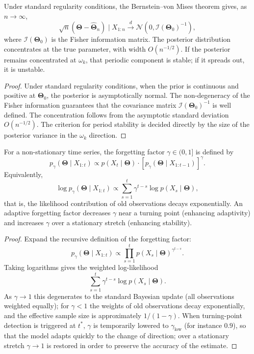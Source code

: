\begin{proposition}\label{prop:ts_bayes_convergence}
Under standard regularity conditions, the Bernstein--von Mises theorem gives, as $n \to \infty$,
\[
\sqrt{n}(\boldsymbol{\Theta} - \hat{\boldsymbol{\Theta}}_n) \mid X_{1:n} \xrightarrow{d} \mathcal{N}(0, \mathcal{I}(\boldsymbol{\Theta}_0)^{-1}),
\]
where $\mathcal{I}(\boldsymbol{\Theta}_0)$ is the Fisher information matrix. The posterior distribution concentrates at the true parameter, with width $O(n^{-1/2})$. If the posterior remains concentrated at $\omega_k$, that periodic component is stable; if it spreads out, it is unstable.
\end{proposition}

\begin{proof}
Under standard regularity conditions, when the prior is continuous and positive at $\boldsymbol{\Theta}_0$, the posterior is asymptotically normal. The non-degeneracy of the Fisher information guarantees that the covariance matrix $\mathcal{I}(\boldsymbol{\Theta}_0)^{-1}$ is well defined. The concentration follows from the asymptotic standard deviation $O(n^{-1/2})$. The criterion for period stability is decided directly by the size of the posterior variance in the $\omega_k$ direction.
\end{proof}

\begin{proposition}\label{prop:ts_forgetting}
For a non-stationary time series, the forgetting factor $\gamma \in (0,1]$ is defined by
\[
p_\gamma(\boldsymbol{\Theta} \mid X_{1:t}) \propto p(X_t \mid \boldsymbol{\Theta}) \cdot [p_\gamma(\boldsymbol{\Theta} \mid X_{1:t-1})]^\gamma.
\]
Equivalently,
\[
\log p_\gamma(\boldsymbol{\Theta} \mid X_{1:t}) \propto \sum_{s=1}^t \gamma^{t-s} \log p(X_s \mid \boldsymbol{\Theta}),
\]
that is, the likelihood contribution of old observations decays exponentially. An adaptive forgetting factor decreases $\gamma$ near a turning point (enhancing adaptivity) and increases $\gamma$ over a stationary stretch (enhancing stability).
\end{proposition}

\begin{proof}
Expand the recursive definition of the forgetting factor:
\[
p_\gamma(\boldsymbol{\Theta} \mid X_{1:t}) \propto \prod_{s=1}^t p(X_s \mid \boldsymbol{\Theta})^{\gamma^{t-s}}.
\]
Taking logarithms gives the weighted log-likelihood
\[
\sum_{s=1}^t \gamma^{t-s} \log p(X_s \mid \boldsymbol{\Theta}).
\]
As $\gamma \to 1$ this degenerates to the standard Bayesian update (all observations weighted equally); for $\gamma < 1$ the weights of old observations decay exponentially, and the effective sample size is approximately $1/(1-\gamma)$. When turning-point detection is triggered at $t^*$, $\gamma$ is temporarily lowered to $\gamma_{\text{low}}$ (for instance $0.9$), so that the model adapts quickly to the change of direction; over a stationary stretch $\gamma \to 1$ is restored in order to preserve the accuracy of the estimate.
\end{proof}

